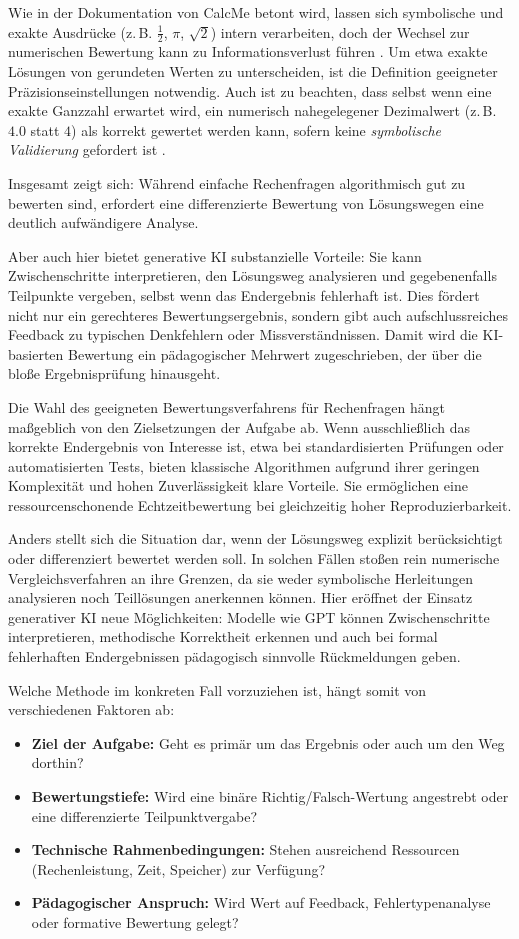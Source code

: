 \documentclass[a4paper,12pt]{article}
\begin{document}
Wie in der Dokumentation von CalcMe betont wird, lassen sich symbolische und exakte Ausdrücke (z.\,B. $\frac{1}{2}$, $\pi$, $\sqrt{2}$) intern verarbeiten, doch der Wechsel zur numerischen Bewertung kann zu Informationsverlust führen \parencite{calcme}. Um etwa exakte Lösungen von gerundeten Werten zu unterscheiden, ist die Definition geeigneter Präzisionseinstellungen notwendig. Auch ist zu beachten, dass selbst wenn eine exakte Ganzzahl erwartet wird, ein numerisch nahegelegener Dezimalwert (z.\,B. $4.0$ statt $4$) als korrekt gewertet werden kann, sofern keine \textit{symbolische Validierung} gefordert ist \parencite{calcme}.

Insgesamt zeigt sich: Während einfache Rechenfragen algorithmisch gut zu bewerten sind, erfordert eine differenzierte Bewertung von Lösungswegen eine deutlich aufwändigere Analyse.

Aber auch hier bietet generative KI substanzielle Vorteile: Sie kann Zwischenschritte interpretieren, den Lösungsweg analysieren und gegebenenfalls Teilpunkte vergeben, selbst wenn das Endergebnis fehlerhaft ist. Dies fördert nicht nur ein gerechteres Bewertungsergebnis, sondern gibt auch aufschlussreiches Feedback zu typischen Denkfehlern oder Missverständnissen. Damit wird die KI-basierten Bewertung ein pädagogischer Mehrwert zugeschrieben, der über die bloße Ergebnisprüfung hinausgeht.

Die Wahl des geeigneten Bewertungsverfahrens für Rechenfragen hängt maßgeblich von den Zielsetzungen der Aufgabe ab. Wenn ausschließlich das korrekte Endergebnis von Interesse ist, etwa bei standardisierten Prüfungen oder automatisierten Tests, bieten klassische Algorithmen aufgrund ihrer geringen Komplexität und hohen Zuverlässigkeit klare Vorteile. Sie ermöglichen eine ressourcenschonende Echtzeitbewertung bei gleichzeitig hoher Reproduzierbarkeit.

Anders stellt sich die Situation dar, wenn der Lösungsweg explizit berücksichtigt oder differenziert bewertet werden soll. In solchen Fällen stoßen rein numerische Vergleichsverfahren an ihre Grenzen, da sie weder symbolische Herleitungen analysieren noch Teillösungen anerkennen können. Hier eröffnet der Einsatz generativer KI neue Möglichkeiten: Modelle wie GPT können Zwischenschritte interpretieren, methodische Korrektheit erkennen und auch bei formal fehlerhaften Endergebnissen pädagogisch sinnvolle Rückmeldungen geben.

Welche Methode im konkreten Fall vorzuziehen ist, hängt somit von verschiedenen Faktoren ab:
\begin{itemize}
  \item \textbf{Ziel der Aufgabe:} Geht es primär um das Ergebnis oder auch um den Weg dorthin?
  \item \textbf{Bewertungstiefe:} Wird eine binäre Richtig/Falsch-Wertung angestrebt oder eine differenzierte Teilpunktvergabe?
  \item \textbf{Technische Rahmenbedingungen:} Stehen ausreichend Ressourcen (Rechenleistung, Zeit, Speicher) zur Verfügung?
  \item \textbf{Pädagogischer Anspruch:} Wird Wert auf Feedback, Fehlertypenanalyse oder formative Bewertung gelegt?
\end{itemize}
\end{document}
